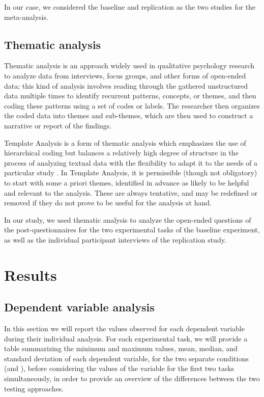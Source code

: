 In our case, we considered the baseline and replication as the two studies for the meta-analysis.



\subsection{Thematic analysis}
Thematic analysis is an approach widely used in qualitative psychology research to analyze data from interviews, focus groups, and other forms of open-ended data; this kind of analysis involves reading through the gathered unstructured data multiple times to identify recurrent patterns, concepts, or themes, and then coding these patterns using a set of codes or labels. The researcher then organizes the coded data into themes and sub-themes, which are then used to construct a narrative or report of the findings.

Template Analysis is a form of thematic analysis which emphasizes the use of hierarchical coding but balances a relatively high degree of structure in the process of analyzing textual data with the flexibility to adapt it to the needs of a particular study \cite{ThematicAnalysis}. In Template Analysis, it is permissible (though not obligatory) to start with some a priori themes, identified in advance as likely to be helpful and relevant to the analysis. These are always tentative, and may be redefined or removed if they do not prove to be useful for the analysis at hand.

In our study, we used thematic analysis to analyze the open-ended questions of the post-questionnaires for the two experimental tasks of the baseline experiment, as well as the individual participant interviews of the replication study.



\section{Results}
\subsection{Dependent variable analysis}
In this section we will report the values observed for each dependent variable during their individual analysis. For each experimental task, we will provide a table summarizing the minimum and maximum values, mean, median, and standard deviation of each dependent variable, for the two separate conditions (\ie \tdd and \notdd), before considering the values of the variable for the first two tasks simultaneously, in order to provide an overview of the differences between the two testing approaches.

